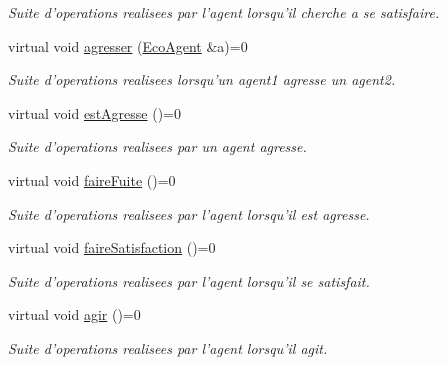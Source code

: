 \begin{CompactItemize}
\begin{CompactList}\small\item\em Suite d'operations realisees par l'agent lorsqu'il cherche a se satisfaire. \item\end{CompactList}\item 
virtual void \hyperlink{classEcoAgent_867f0c274eb3ed0b61cb1fe7baa67edd}{agresser} (\hyperlink{classEcoAgent}{EcoAgent} \&a)=0
\begin{CompactList}\small\item\em Suite d'operations realisees lorsqu'un agent1 agresse un agent2. \item\end{CompactList}\item 
\hypertarget{classEcoAgent_a27bced909d9d84e8f23ec2d65bbed56}{
virtual void \hyperlink{classEcoAgent_a27bced909d9d84e8f23ec2d65bbed56}{estAgresse} ()=0}
\label{classEcoAgent_a27bced909d9d84e8f23ec2d65bbed56}

\begin{CompactList}\small\item\em Suite d'operations realisees par un agent agresse. \item\end{CompactList}\item 
\hypertarget{classEcoAgent_80b798ec4abc1585c42185ae88445695}{
virtual void \hyperlink{classEcoAgent_80b798ec4abc1585c42185ae88445695}{faireFuite} ()=0}
\label{classEcoAgent_80b798ec4abc1585c42185ae88445695}

\begin{CompactList}\small\item\em Suite d'operations realisees par l'agent lorsqu'il est agresse. \item\end{CompactList}\item 
\hypertarget{classEcoAgent_ab76d1cc6f418192d90fc42c2fc4d8ac}{
virtual void \hyperlink{classEcoAgent_ab76d1cc6f418192d90fc42c2fc4d8ac}{faireSatisfaction} ()=0}
\label{classEcoAgent_ab76d1cc6f418192d90fc42c2fc4d8ac}

\begin{CompactList}\small\item\em Suite d'operations realisees par l'agent lorsqu'il se satisfait. \item\end{CompactList}\item 
\hypertarget{classEcoAgent_ec8ff50dddde6ad423ee13ee602adcaf}{
virtual void \hyperlink{classEcoAgent_ec8ff50dddde6ad423ee13ee602adcaf}{agir} ()=0}
\label{classEcoAgent_ec8ff50dddde6ad423ee13ee602adcaf}

\begin{CompactList}\small\item\em Suite d'operations realisees par l'agent lorsqu'il agit. \item\end{CompactList}\end{CompactItemize}
